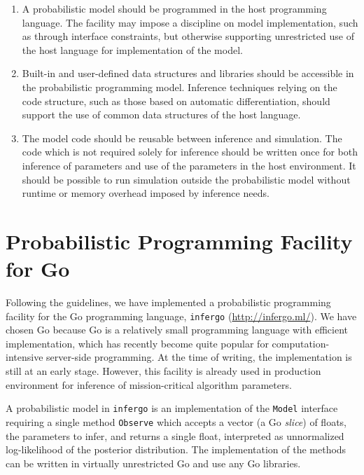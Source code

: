 \documentclass[sigplan,review]{acmart}\settopmatter{printfolios=true,printccs=false,printacmref=false}
\begin{document}
\begin{enumerate}
\item A probabilistic model should be programmed in the host
programming language. The facility may impose a discipline on
model implementation, such as through interface constraints, but
otherwise supporting unrestricted use of the host language for
implementation of the model.

\item Built-in and user-defined data structures and libraries
should be accessible in the probabilistic programming model.
Inference techniques relying on the code structure, such as
those based on automatic differentiation, should support the
use of common data structures of the host language.

\item The model code should be reusable between inference and
simulation. The code which is not required solely for inference
should be written once for both inference of parameters and use
of the parameters in the host environment.  It should be
possible to run simulation outside the probabilistic model without
runtime or memory overhead imposed by inference needs.
\end{enumerate}

\section{Probabilistic Programming Facility for
Go}

Following the guidelines, we have implemented a probabilistic
programming facility for the Go programming language,
\texttt{infergo} (\url{http://infergo.ml/}). We have chosen Go
because Go is a relatively small programming language with
efficient implementation, which has recently become quite
popular for computation-intensive server-side programming. At
the time of writing, the implementation is still at an early
stage. However, this facility is already used in production
environment for inference of mission-critical algorithm
parameters.  

A probabilistic model in \texttt{infergo} is an implementation
of the \texttt{Model} interface requiring a single method
\texttt{Observe} which accepts a vector (a Go \textit{slice}) of
floats, the parameters to infer, and returns a single float,
interpreted as unnormalized log-likelihood of the posterior
distribution. The implementation of the methods can be written
in virtually unrestricted Go and use any Go libraries.
\end{document}
